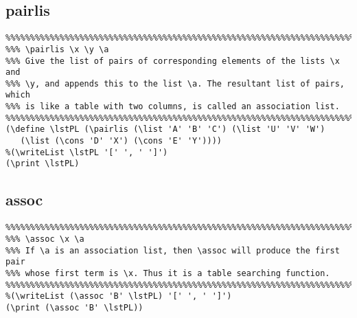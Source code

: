 \documentclass[10pt,a4paper]{article}
\begin{document}
\begin{framed}
\noindent
{}
\end{framed}


\subsection{pairlis}
\begin{verbatim}
%%%%%%%%%%%%%%%%%%%%%%%%%%%%%%%%%%%%%%%%%%%%%%%%%%%%%%%%%%%%%%%%%%%%%%%%%%%%%
%%% \pairlis \x \y \a
%%% Give the list of pairs of corresponding elements of the lists \x and
%%% \y, and appends this to the list \a. The resultant list of pairs, which 
%%% is like a table with two columns, is called an association list. 
%%%%%%%%%%%%%%%%%%%%%%%%%%%%%%%%%%%%%%%%%%%%%%%%%%%%%%%%%%%%%%%%%%%%%%%%%%%%%
(\define \lstPL (\pairlis (\list 'A' 'B' 'C') (\list 'U' 'V' 'W') 
   (\list (\cons 'D' 'X') (\cons 'E' 'Y'))))
%(\writeList \lstPL '[' ', ' ']')
(\print \lstPL)
\end{verbatim}

\begin{framed}
\noindent
{}
\end{framed}


\subsection{assoc}
\begin{verbatim}
%%%%%%%%%%%%%%%%%%%%%%%%%%%%%%%%%%%%%%%%%%%%%%%%%%%%%%%%%%%%%%%%%%%%%%%%%%%%%
%%% \assoc \x \a
%%% If \a is an association list, then \assoc will produce the first pair 
%%% whose first term is \x. Thus it is a table searching function. 
%%%%%%%%%%%%%%%%%%%%%%%%%%%%%%%%%%%%%%%%%%%%%%%%%%%%%%%%%%%%%%%%%%%%%%%%%%%%%
%(\writeList (\assoc 'B' \lstPL) '[' ', ' ']')
(\print (\assoc 'B' \lstPL))
\end{verbatim}

\begin{framed}
\noindent
{}
\end{framed}
\end{document}
